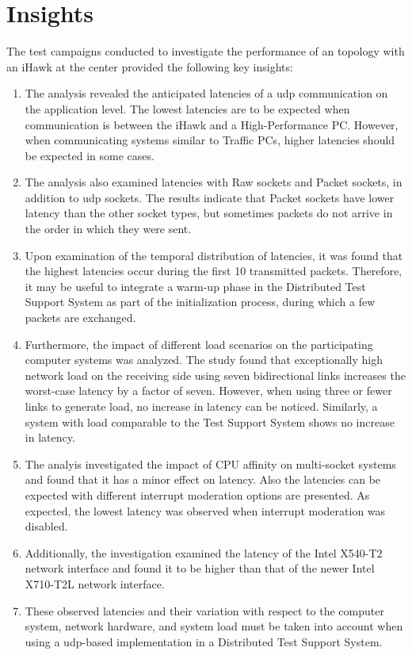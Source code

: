 \clearpage
\section{Insights} \label{insight:perf}
The test campaigns conducted to investigate the performance of an topology with an iHawk at the center provided the following key insights:

\begin{enumerate}[label=(\roman*),resume]
    \item The analysis revealed the anticipated latencies of a \ac{udp} communication on the application level. The lowest latencies are to be expected when communication is between the iHawk and a High-Performance PC. However, when communicating systems similar to Traffic PCs, higher latencies should be expected in some cases. \label{insight:perf:1}
    \item The analysis also examined latencies with Raw sockets and Packet sockets, in addition to \ac{udp} sockets. The results indicate that Packet sockets have lower latency than the other socket types, but sometimes packets do not arrive in the order in which they were sent. \label{insight:perf:2}
    \item Upon examination of the temporal distribution of latencies, it was found that the highest latencies occur during the first 10 transmitted packets. Therefore, it may be useful to integrate a warm-up phase in the Distributed Test Support System as part of the initialization process, during which a few packets are exchanged.
    \item Furthermore, the impact of different load scenarios on the participating computer systems was analyzed. The study found that exceptionally high network load on the receiving side using seven bidirectional links increases the worst-case latency by a factor of seven. However, when using three or fewer links to generate load, no increase in latency can be noticed. Similarly, a system with load comparable to the Test Support System shows no increase in latency. \label{insight:perf:3}
    \item The analyis investigated the impact of \ac{CPU} affinity on multi-socket systems and found that it has a minor effect on latency. Also the latencies can be expected with different interrupt moderation options are presented. As expected, the lowest latency was observed when interrupt moderation was disabled. \label{insight:perf:4}
    \item Additionally, the investigation examined the latency of the Intel X540-T2 network interface and found it to be higher than that of the newer Intel X710-T2L network interface. \label{insight:perf:5}
    \item These observed latencies and their variation with respect to the computer system, network hardware, and system load must be taken into account when using a \ac{udp}-based implementation in a Distributed Test Support System. \label{insight:perf:6}
\end{enumerate}


 



